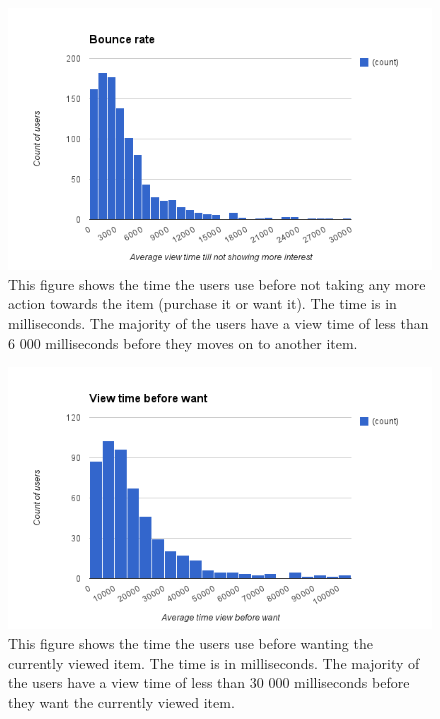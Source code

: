 
    \begin{figure}[H]
        \includegraphics[width=5in]{image/bounceRate.png}
        \centering
        \caption[View time before leaving an item (Bounce Rate)]{This figure shows the time the users use before not taking any more action towards the item (purchase it or want it).
        The time is in milliseconds.
        The majority of the users have a view time of less than 6 000 milliseconds before they moves on to another item.}
        \label{figure:bounceRate}
    \end{figure}


    \begin{figure}[H]
        \includegraphics[width=5in]{image/viewBeforeWant.png}
        \centering
        \caption[View time before wanting an item]{This figure shows the time the users use before wanting the currently viewed item.
        The time is in milliseconds.
        The majority of the users have a view time of less than 30 000 milliseconds before they want the currently viewed item.}
        \label{figure:viewWant}
    \end{figure}

